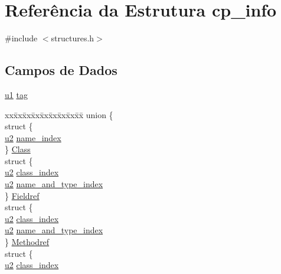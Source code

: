 \hypertarget{structcp__info}{}\section{Referência da Estrutura cp\+\_\+info}
\label{structcp__info}


{\ttfamily \#include $<$structures.\+h$>$}

\subsection*{Campos de Dados}
\begin{DoxyCompactItemize}
\item 
\hyperlink{lista__operandos_8h_ad9f4cdb6757615aae2fad89dab3c5470}{u1} \hyperlink{structcp__info_a045b8801a6e96a2a31d3b62ea684f141}{tag}
\item 
\begin{tabbing}
xx\=xx\=xx\=xx\=xx\=xx\=xx\=xx\=xx\=\kill
union \{\\
\>struct \{\\
\>\>\hyperlink{lista__operandos_8h_a732cde1300aafb73b0ea6c2558a7a54f}{u2} \hyperlink{structcp__info_a0b2c4677d0d56defd858fdc796caec87}{name\_index}\\
\>\} \hyperlink{structcp__info_aa2cc42e313a1550a5f5e8c0d7ffc58ee}{Class}\\
\>struct \{\\
\>\>\hyperlink{lista__operandos_8h_a732cde1300aafb73b0ea6c2558a7a54f}{u2} \hyperlink{structcp__info_a1c7c3f3e2f9a620669b5f5cc51249ef8}{class\_index}\\
\>\>\hyperlink{lista__operandos_8h_a732cde1300aafb73b0ea6c2558a7a54f}{u2} \hyperlink{structcp__info_a1b947f3ff3eee58acf5500debf45848c}{name\_and\_type\_index}\\
\>\} \hyperlink{structcp__info_a9294f4a6ae7fb7a705ca3d01f4eb16d9}{Fieldref}\\
\>struct \{\\
\>\>\hyperlink{lista__operandos_8h_a732cde1300aafb73b0ea6c2558a7a54f}{u2} \hyperlink{structcp__info_a1c7c3f3e2f9a620669b5f5cc51249ef8}{class\_index}\\
\>\>\hyperlink{lista__operandos_8h_a732cde1300aafb73b0ea6c2558a7a54f}{u2} \hyperlink{structcp__info_a1b947f3ff3eee58acf5500debf45848c}{name\_and\_type\_index}\\
\>\} \hyperlink{structcp__info_a4afc97985c76278f209a037ed49247cd}{Methodref}\\
\>struct \{\\
\>\>\hyperlink{lista__operandos_8h_a732cde1300aafb73b0ea6c2558a7a54f}{u2} \hyperlink{structcp__info_a1c7c3f3e2f9a620669b5f5cc51249ef8}{class\_index}\\

\end{tabbing}
\end{DoxyCompactItemize}
